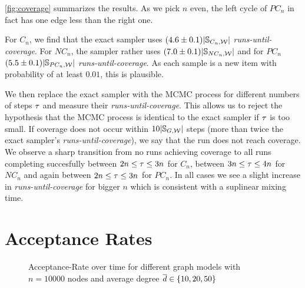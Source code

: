\cref{fig:coverage} summarizes the results.
As we pick $n$ even, the left cycle of $PC_n$ in fact has one edge less than the right one.

For $C_n$, we find that the exact sampler uses $(4.6 \pm 0.1)|\mathbb S_{C_n,\mathcal W}|$ \emph{runs-until-coverage}.
For $NC_n$, the sampler rather uses $(7.0 \pm 0.1)|\mathbb S_{NC_n,\mathcal W}|$ and for $PC_n$ $(5.5 \pm 0.1)|\mathbb S_{PC_n,\mathcal W}|$ \emph{runs-until-coverage}.
As each sample is a new item with probability of at least $0.01$, this is plausible.

We then replace the exact sampler with the MCMC process for different numbers of steps $\tau$ and measure their \emph{runs-until-coverage}.
This allows us to reject the hypothesis that the MCMC process is identical to the exact sampler if $\tau$ is too small.
If coverage does not occur within $10|\mathbb{S}_{G, \mathcal W}|$ steps (\ie more than twice the exact sampler's \emph{runs-until-coverage}), we say that the run does not reach coverage.
We observe a sharp transition from no runs achieving coverage to all runs completing succesfully between $2n \leq \tau \leq 3n$ for $C_n$, between $3n \leq \tau \leq 4n$ for $NC_n$ and again between $2n \leq \tau \leq 3n$ for $PC_n$.
In all cases we see a slight increase in \emph{runs-until-coverage} for bigger $n$ which is consistent with a suplinear mixing time.


\section{Acceptance Rates}\label{sec:exp_acc}
\begin{figure}[!tb]
  \centering
  \caption{
    Acceptance-Rate over time for different graph models with $n = 10000$ nodes and average degree $\overline{d} \in \left\{10, 20, 50\right\}$
  }
  \label{fig:acc_rates}
\end{figure}

